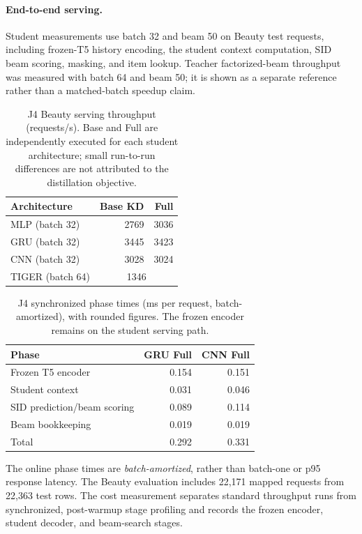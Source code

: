 \documentclass[sigconf, anonymous, review]{acmart}
\begin{document}
\paragraph{End-to-end serving.}
Student measurements use batch 32 and beam 50 on Beauty
test requests, including frozen-T5 history encoding,
the student context computation, SID beam scoring,
masking, and item lookup. Teacher factorized-beam
throughput was measured with batch 64 and beam 50;
it is shown as a separate reference rather than
a matched-batch speedup claim.

\begin{table}[t]
\centering\small
\caption{J4 Beauty serving throughput (requests/s).
Base and Full are independently executed for each
student architecture; small run-to-run differences are
not attributed to the distillation objective.}
\label{tab:sup-cost-online}
\setlength{\tabcolsep}{4pt}
\begin{tabular}{lrr}
\toprule
Architecture & Base KD & Full\\
\midrule
MLP (batch 32) & 2769 & 3036\\
GRU (batch 32) & 3445 & 3423\\
CNN (batch 32) & 3028 & 3024\\
\midrule
TIGER (batch 64) & \multicolumn{2}{c}{1346}\\
\bottomrule
\end{tabular}
\end{table}

\begin{table}[t]
\centering\small
\caption{J4 synchronized phase times (ms per request,
batch-amortized), with rounded figures. The frozen
encoder remains on the student serving path.}
\label{tab:sup-cost-phases}
\setlength{\tabcolsep}{2.5pt}
\begin{tabular}{lrr}
\toprule
Phase & GRU Full & CNN Full\\
\midrule
Frozen T5 encoder & 0.154 & 0.151\\
Student context & 0.031 & 0.046\\
SID prediction/beam scoring & 0.089 & 0.114\\
Beam bookkeeping & 0.019 & 0.019\\
\midrule
Total & 0.292 & 0.331\\
\bottomrule
\end{tabular}
\end{table}

The online phase times are \emph{batch-amortized}, rather
than batch-one or p95 response latency. The Beauty evaluation
includes 22,171 mapped requests from 22,363 test rows.
The cost measurement separates standard throughput runs
from synchronized, post-warmup stage profiling and records
the frozen encoder, student decoder, and beam-search stages.
\end{document}
